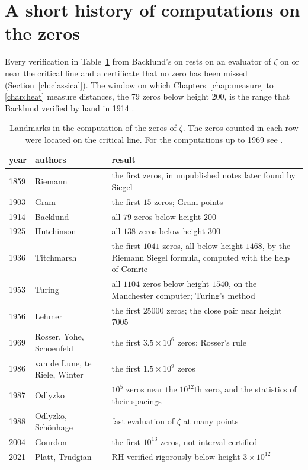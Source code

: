 \section{A short history of computations on the zeros}\label{app:history}

Every verification in Table~\ref{tab:appB} from Backlund's on rests on an evaluator of $\zeta$ on or near the critical line and a certificate that no zero has been missed (Section~\ref{ch:classical}). The window on which Chapters~\ref{chap:measure} to \ref{chap:heat} measure distances, the $79$ zeros below height $200$, is the range that Backlund verified by hand in 1914 \cite{Backlund14}.

\begin{table}[htbp]
\centering\small
\begin{tabular}{@{}llp{}@{}}
\toprule
year & authors & result\\
\midrule
1859 & Riemann & \raggedright the first zeros, in unpublished notes later found by Siegel \cite{Siegel32}\tabularnewline
1903 & Gram & \raggedright the first $15$ zeros; Gram points \cite{Gram03}\tabularnewline
1914 & Backlund & \raggedright all $79$ zeros below height $200$ \cite{Backlund14,Backlund}\tabularnewline
1925 & Hutchinson & \raggedright all $138$ zeros below height $300$ \cite{Hutchinson25}\tabularnewline
1936 & Titchmarsh & \raggedright the first $1041$ zeros, all below height $1468$, by the Riemann Siegel formula, computed with the help of Comrie \cite{Titchmarsh36}\tabularnewline
1953 & Turing & \raggedright all $1104$ zeros below height $1540$, on the Manchester computer; Turing's method \cite{Turing53}\tabularnewline
1956 & Lehmer & \raggedright the first $25000$ zeros; the close pair near height $7005$ \cite{Lehmer56,Lehmer56b}\tabularnewline
1969 & Rosser, Yohe, Schoenfeld & \raggedright the first $3.5\times10^6$ zeros; Rosser's rule \cite{RYS69}\tabularnewline
1986 & van de Lune, te Riele, Winter & \raggedright the first $1.5\times10^9$ zeros \cite{LRW86}\tabularnewline
1987 & Odlyzko & \raggedright $10^5$ zeros near the $10^{12}$th zero, and the statistics of their spacings \cite{Odlyzko87}\tabularnewline
1988 & Odlyzko, Sch\"onhage & \raggedright fast evaluation of $\zeta$ at many points \cite{OS88}\tabularnewline
2004 & Gourdon & \raggedright the first $10^{13}$ zeros, not interval certified \cite{Gourdon04}\tabularnewline
2021 & Platt, Trudgian & \raggedright RH verified rigorously below height $3\times10^{12}$ \cite{PT21}\tabularnewline
\bottomrule
\end{tabular}
\caption{Landmarks in the computation of the zeros of $\zeta$. The zeros counted in each row were located on the critical line. For the computations up to 1969 see \cite[Chapters 6 to 8]{Edwards}.}
\label{tab:appB}
\end{table}

